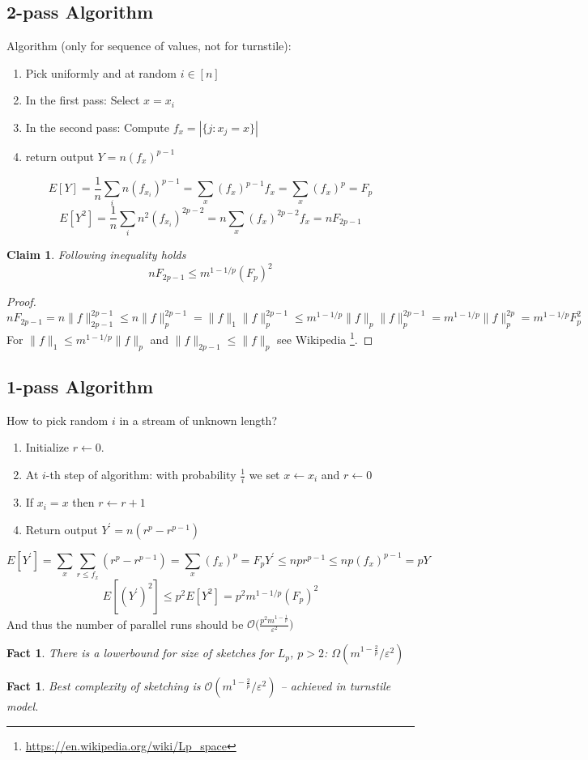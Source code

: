 \documentclass[11pt]{article}
\newtheorem{claim}[theorem]{Claim}
\newtheorem{fact}[theorem]{Fact}
\begin{document}
\subsection{2-pass Algorithm}
Algorithm (only for sequence of values, not for turnstile):
  \begin{enumerate}
    \item Pick uniformly and at random $i \in [n]$
    \item In the first pass: Select $x = x_i$
    \item In the second pass: Compute $f_{x} = |\{ j : x_j = x \}|$
    \item return output $Y = n (f_x)^{p-1}$
  \end{enumerate}
$$E[Y] = \frac{1}{n}\sum_{i} n(f_{x_i})^{p-1} = \sum_{x} (f_x)^{p-1} f_x = \sum_{x} (f_x)^p = F_p$$
$$E[Y^2] = \frac{1}{n}\sum_{i}n^2 (f_{x_i})^{2p-2} = n \sum_{x} (f_x)^{2p-2} f_x = n F_{2p-1}$$

\begin{claim}
  Following inequality holds $$n F_{2p-1} \leq m^{1-1/p} (F_p)^2$$
\end{claim}
\begin{proof}
$$nF_{2p-1} = n \|f\|_{2p-1}^{2p-1} \leq n \|f\|_{p}^{2p-1} = \|f\|_1 \|f\|_p^{2p-1} \leq m^{1 - 1/p} \|f\|_p \|f\|_p^{2p-1} = m^{1 - 1/p} \|f\|_p^{2p} = m^{1 - 1/p} F_p^2$$
For $\|f\|_1 \leq m^{1 - 1/p} \|f\|_p$ and $\|f\|_{2p-1} \le \|f\|_p$ see Wikipedia \footnote{\url{https://en.wikipedia.org/wiki/Lp_space}}.
\end{proof}
\subsection{1-pass Algorithm}
How to pick random $i$ in a stream of unknown length?
\begin{enumerate}
  \item Initialize $r \gets 0$.
  \item At $i$-th step of algorithm: with probability $\frac{1}{i}$ we set $x \gets x_i$ and $r \gets 0$
  \item If $x_{i} = x$ then $r \gets r + 1$
  \item Return output $Y^\prime = n(r^p - r^{p-1})$
\end{enumerate}
$$E[Y^\prime] = \sum_x \sum_{r \leq f_x} (r^p-r^{p-1}) = \sum_x (f_x)^p = F_p
Y^\prime \leq n p r^{p-1} \leq n p (f_x)^{p-1} = p Y$$
$$E[(Y^\prime)^2] \leq p^2 E[Y^2] = p^2 m^{1-1/p} (F_p)^2$$
And thus the number of parallel runs should be $\mathcal{O}\Big(\frac{p^2 m^{1 - \frac{1}{p}}}{\varepsilon^2}\Big)$

\begin{fact}
  There is a lowerbound for size of sketches for $L_p$, $p > 2$: $\Omega(m^{1-\frac{2}{p}}/\varepsilon^2)$ \cite{DBLP:journals/jcss/Bar-YossefJKS04}
\end{fact}
\begin{fact}
  Best complexity of sketching is $\mathcal{O}(m^{1-\frac{2}{p}}/\varepsilon^2)$ -- achieved in turnstile model. \cite{DBLP:conf/stoc/IndykW05}
\end{fact}



\end{document}
